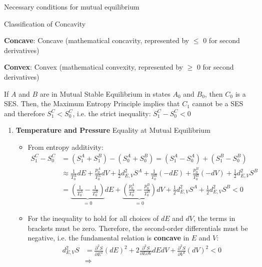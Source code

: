 \begin{thm}
    Necessary conditions for mutual equilibrium

    \begin{zhu}
        Classification of Concavity
        \par\indent
        \textbf{Concave}: Concave (mathematical concavity, represented by $\leq$ 0 for second derivatives)
        \par\indent
        \textbf{Convex}: Convex (mathematical convexity, represented by $\geq$ 0 for second derivatives)        
    \end{zhu}
    If \( A \) and \( B \) are in Mutual Stable Equilibrium in states \( A_0 \) and \( B_0 \), then \( C_0 \) is a SES. 
    Then, the Maximum Entropy Principle implies that \( C_1 \) cannot be a SES and therefore \( S^C_1 < S^C_0 \), 
    i.e. the strict inequality:
    \(S^C_1 - S^C_0 < 0\)
    \begin{enumerate}
        \item \textbf{Temperature and Pressure} Equality at Mutual Equilibrium
        \begin{itemize}
            \item From entropy additivity:
        \begin{align*}
                S^C_1 - S^C_0 &= (S^A_1 + S^B_1) - (S^A_0 + S^B_0) = (S^A_1 - S^A_0) + (S^B_1 - S^B_0)\\
                &\approx \frac{1}{T^A_0} dE + \frac{p^A_0}{T^A_0} dV + \frac{1}{2} d^2_{E,V} S^A 
                + \frac{1}{T^B_0} (-dE) + \frac{p^B_0}{T^B_0} (-dV) + \frac{1}{2} d^2_{E,V} S^B \\
                &= \underbrace{\left( \frac{1}{T^A_0} - \frac{1}{T^B_0} \right)}_{=0} dE 
                + \underbrace{\left( \frac{p^A_0}{T^A_0} - \frac{p^B_0}{T^B_0} \right)}_{=0} dV 
                + \frac{1}{2} d^2_{E,V} S^A + \frac{1}{2} d^2_{E,V} S^B < 0
        \end{align*}
        \item For the inequality to hold for all choices of \( dE \) and \( dV \), 
        the terms in brackets must be zero. Therefore, the second-order differentials must be negative, 
        i.e. the fundamental relation is \textbf{concave} in \( E \) and \( V \):
\begin{align*}
            d_{E,V}^2 S &= \frac{\partial^2 S}{\partial E^2} (dE)^2 + 2 \frac{\partial^2 S}{\partial E \partial V} dEdV + \frac{\partial^2 S}{\partial V^2} (dV)^2 < 0
            \\&\Rightarrow

\end{align*}
\end{itemize}
\end{enumerate}
\end{thm}
